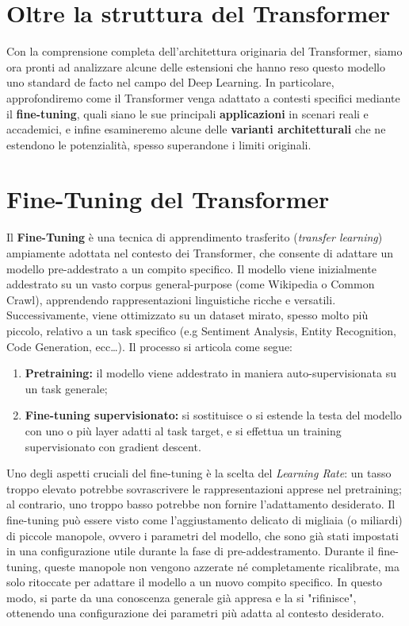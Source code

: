 \section{Oltre la struttura del Transformer}

Con la comprensione completa dell'architettura originaria del Transformer, siamo ora pronti ad analizzare alcune delle estensioni che hanno reso questo modello uno standard de facto nel campo del Deep Learning. In particolare, approfondiremo come il Transformer venga adattato a contesti specifici mediante il \textbf{fine-tuning}, quali siano le sue principali \textbf{applicazioni} in scenari reali e accademici, e infine esamineremo alcune delle \textbf{varianti architetturali} che ne estendono le potenzialità, spesso superandone i limiti originali.

\section{Fine-Tuning del Transformer}

Il \textbf{Fine-Tuning} è una tecnica di apprendimento trasferito (\textit{transfer learning}) ampiamente adottata nel contesto dei Transformer, che consente di adattare un modello pre-addestrato a un compito specifico. Il modello viene inizialmente addestrato su un vasto corpus general-purpose (come Wikipedia o Common Crawl), apprendendo rappresentazioni linguistiche ricche e versatili. Successivamente, viene ottimizzato su un dataset mirato, spesso molto più piccolo, relativo a un task specifico (e.g Sentiment Analysis, Entity Recognition, Code Generation, ecc\ldots). Il processo si articola come segue:
    \begin{enumerate}
        \item \textbf{Pretraining:} il modello viene addestrato in maniera auto-supervisionata su un task generale;
        \item \textbf{Fine-tuning supervisionato:} si sostituisce o si estende la testa del modello con uno o più layer adatti al task target, e si effettua un training supervisionato con gradient descent.
    \end{enumerate}
Uno degli aspetti cruciali del fine-tuning è la scelta del \textit{Learning Rate}: un tasso troppo elevato potrebbe sovrascrivere le rappresentazioni apprese nel pretraining; al contrario, uno troppo basso potrebbe non fornire l'adattamento desiderato. Il fine-tuning può essere visto come l’aggiustamento delicato di migliaia (o miliardi) di piccole manopole, ovvero i parametri del modello, che sono già stati impostati in una configurazione utile durante la fase di pre-addestramento. Durante il fine-tuning, queste manopole non vengono azzerate né completamente ricalibrate, ma solo ritoccate per adattare il modello a un nuovo compito specifico. In questo modo, si parte da una conoscenza generale già appresa e la si "rifinisce", ottenendo una configurazione dei parametri più adatta al contesto desiderato.

